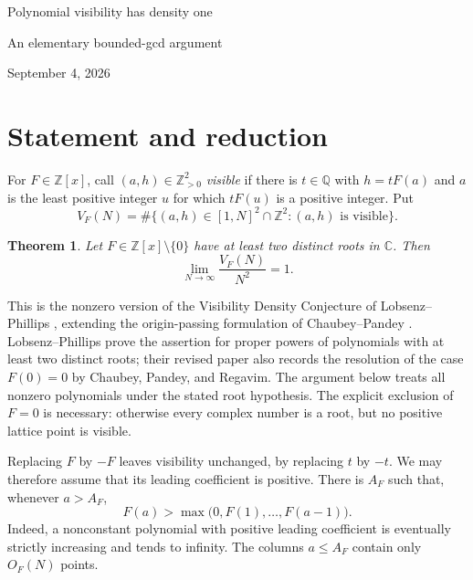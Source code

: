 \documentclass[10pt]{article}
\newtheorem{theorem}{Theorem}
\newcommand{\Z}{\mathbb Z}
\newcommand{\Q}{\mathbb Q}
\newcommand{\C}{\mathbb C}
\begin{document}
\begin{center}
{\LARGE Polynomial visibility has density one\par}
\vspace{0.3em}
{\large An elementary bounded-gcd argument\par}
\vspace{0.6em}
{\small September 4, 2026}
\end{center}
\begin{abstract}
For every nonzero integral polynomial with at least two distinct complex
roots, almost every positive lattice point is visible along its rational
vertical dilates. The proof has two ingredients: the gcd of a polynomial
value and an independent height is bounded outside a set of arbitrarily
small upper density; and every fixed proper ratio of polynomial values
occurs at a set of arguments of density zero. Both ingredients admit
elementary proofs. No uniform estimate over varying ratios is needed.
\end{abstract}

\section{Statement and reduction}
For $F\in\Z[x]$, call $(a,h)\in\Z_{>0}^2$ \emph{visible} if there is
$t\in\Q$ with $h=tF(a)$ and $a$ is the least positive integer $u$ for
which $tF(u)$ is a positive integer. Put
\[
 V_F(N)=\#\{(a,h)\in[1,N]^2\cap\Z^2:(a,h)\text{ is visible}\}.
\]
\begin{theorem}\label{thm:main}
Let $F\in\Z[x]\setminus\{0\}$ have at least two distinct roots in $\C$.
Then
\[
                    \lim_{N\to\infty}\frac{V_F(N)}{N^2}=1.
\]
\end{theorem}
This is the nonzero version of the Visibility Density Conjecture of
Lobsenz--Phillips \cite{LP}, extending the origin-passing formulation
of Chaubey--Pandey \cite{CP}. Lobsenz--Phillips prove the assertion for
proper powers of polynomials with at least two distinct roots; their
revised paper also records the resolution of the case $F(0)=0$ by
Chaubey, Pandey, and Regavim. The argument below treats all nonzero
polynomials under the stated root
hypothesis. The explicit exclusion of $F=0$ is necessary: otherwise
every complex number is a root, but no positive lattice point is visible.

Replacing $F$ by $-F$ leaves visibility unchanged, by replacing $t$ by
$-t$. We may therefore assume that its leading coefficient is positive.
There is $A_F$ such that, whenever $a>A_F$,
\begin{equation}\label{eq:record}
             F(a)>\max\bigl(0,F(1),\ldots,F(a-1)\bigr).
\end{equation}
Indeed, a nonconstant polynomial with positive leading coefficient is
eventually strictly increasing and tends to infinity. The columns
$a\le A_F$ contain only $O_F(N)$ points.
\end{document}
